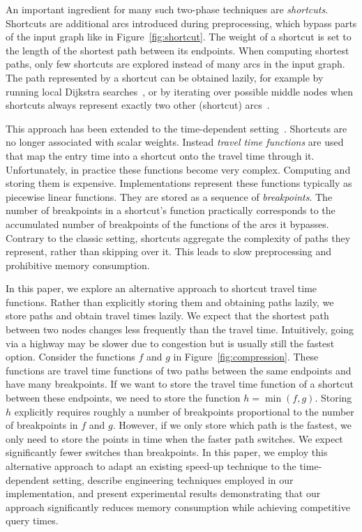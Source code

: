 \documentclass[a4paper,UKenglish,cleveref,autoref]{lipics-v2019}
\begin{document}
An important ingredient for many such two-phase techniques \cite{bdgmpsww-rptn-16,bd-sharc-09,dn-crdtd-12,dsw-cch-15,gssv-erlrn-12} are \emph{shortcuts}.
Shortcuts are additional arcs introduced during preprocessing, which bypass parts of the input graph like in Figure~\ref{fig:shortcut}.
The weight of a shortcut is set to the length of the shortest path between its endpoints.
When computing shortest paths, only few shortcuts are explored instead of many arcs in the input graph.
The path represented by a shortcut can be obtained lazily, for example by running local Dijkstra searches~\cite{dgpw-crprn-13}, or by iterating over possible middle nodes when shortcuts always represent exactly two other (shortcut) arcs~\cite{dsw-cch-15,gssv-erlrn-12}.

This approach has been extended to the time-dependent setting~\cite{bgsv-mtdtt-13,bdpw-dtdrp-16}.
Shortcuts are no longer associated with scalar weights.
Instead \emph{travel time functions} are used that map the entry time into a shortcut onto the travel time through it.
Unfortunately, in practice these functions become very complex.
Computing and storing them is expensive.
Implementations represent these functions typically as piecewise linear functions.
They are stored as a sequence of \emph{breakpoints}.
The number of breakpoints in a shortcut's function practically corresponds to the accumulated number of breakpoints of the functions of the arcs it bypasses.
Contrary to the classic setting, shortcuts aggregate the complexity of paths they represent, rather than skipping over it.
This leads to slow preprocessing and prohibitive memory consumption.

In this paper, we explore an alternative approach to shortcut travel time functions.
Rather than explicitly storing them and obtaining paths lazily, we store paths and obtain travel times lazily.
We expect that the shortest path between two nodes changes less frequently than the travel time.
Intuitively, going via a highway may be slower due to congestion but is usually still the fastest option.
Consider the functions $f$ and $g$ in Figure~\ref{fig:compression}.
These functions are travel time functions of two paths between the same endpoints and have many breakpoints.
If we want to store the travel time function of a shortcut between these endpoints, we need to store the function $h = \min(f, g)$.
Storing $h$ explicitly requires roughly a number of breakpoints proportional to the number of breakpoints in $f$ and $g$.
However, if we only store which path is the fastest, we only need to store the points in time when the faster path switches.
We expect significantly fewer switches than breakpoints.
In this paper, we employ this alternative approach to adapt an existing speed-up technique to the time-dependent setting, describe engineering techniques employed in our implementation, and present experimental results demonstrating that our approach significantly reduces memory consumption while achieving competitive query times.
\end{document}
